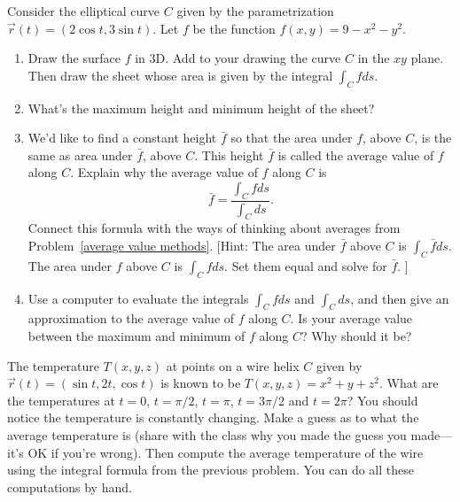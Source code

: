 \begin{problem}\label{Average Value intro}%
%
 Consider the elliptical curve $C$ given by the parametrization $\vec r(t) = (2\cos t, 3\sin t)$.  Let $f$ be the function $f(x,y)=9-x^2-y^2$.    \begin{enumerate}
  \item Draw the surface $f$ in 3D.  Add to your drawing the curve $C$ in the $xy$ plane. Then draw the sheet whose area is given by the integral $\int_C f ds$. 
  \item What's the maximum height and minimum height of the sheet? 
  \item We'd like to find a constant height $\bar f$ so that the area under $f$, above $C$, is the same as area under $\bar f$, above $C$. This height $\bar f$ is called the average value of $f$ along $C$. 
{}%
Explain why the average value of $f$ along $C$ is 
$$\bar f = \frac{\int_C f ds}{\int_C ds}.$$
Connect this formula with the ways of thinking about averages from Problem~\ref{average value methods}.
[Hint: The area under $\bar f$ above $C$ is $\int_C \bar f ds$. The area under $f$ above $C$ is $\int_C f ds$. Set them equal and solve for $\bar f$. ]  
  \item 
{}%
Use a computer to evaluate the integrals $\int_C f ds$ and $\int_C ds$, and then give an approximation to the average value of $f$ along $C$. Is your average value between the maximum and minimum of $f$ along $C$? Why should it be?
 \end{enumerate}
\end{problem}

\begin{problem}%
 The temperature $T(x,y,z)$ at points on a wire helix $C$ given by $\vec r(t) = (\sin t, 2t, \cos t)$ is known to be $T(x,y,z)=x^2+y+z^2$. What are the temperatures at $t=0$, $t=\pi/2$, $t=\pi$, $t=3\pi/2$ and $t=2\pi$?  You should notice the temperature is constantly changing.  Make a guess as to what the average temperature is (share with the class why you made the guess you made---it's OK if you're wrong). Then compute the average temperature of the wire using the integral formula from the previous problem. You can do all these computations by hand.
\end{problem}

